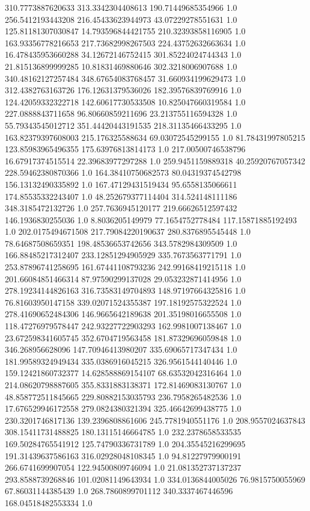 310.7773887620633	313.3342304408613	190.71449685354966	1.0
256.5412193443208	216.45433623944973	43.07229278551631	1.0
125.81181307030847	14.793596844421755	210.32393858116905	1.0
163.93356778216653	217.73682998267503	224.43752632663634	1.0
16.478435953660288	34.12672146752415	301.85224024744343	1.0
21.815136899999285	10.81831469880646	302.3218006907688	1.0
340.48162127257484	348.67654083768457	31.660934199629473	1.0
312.4382763163726	176.12631379536026	182.39576839769916	1.0
124.42059332322718	142.60617730533508	10.825047660319584	1.0
227.0888843711658	96.80660859211696	23.213755116594328	1.0
55.79343545012712	351.44420443191535	218.31135466433295	1.0
163.82379397608003	215.176325588634	69.03072545299155	1.0
81.78431997805215	123.85983965496355	175.63976813814173	1.0
217.00500746538796	16.67917374515514	22.39683977297288	1.0
259.9451159889318	40.25920767057342	228.59462380870366	1.0
164.38410750682573	80.04319374542798	156.13132490335892	1.0
167.47129431519434	95.6558135066611	174.85535332243407	1.0
48.252679377114404	314.524148111186	348.3185472132726	1.0
257.7636945120177	219.66626512597432	146.1936830255036	1.0
8.8036205149979	77.1654752778484	117.15871885192493	1.0
202.0175494671508	217.79084220190637	280.8376895545448	1.0
78.64687508659351	198.48536653742656	343.5782984309509	1.0
166.88485217312407	233.12851294905929	335.7673563771791	1.0
253.87896741258695	161.67441108793236	242.99168419215118	1.0
201.66084851466314	87.97590299137028	29.053232871414956	1.0
278.19234144826163	316.73583149704893	148.97197664325816	1.0
76.81603950147158	339.02071524355387	197.18192575322524	1.0
278.41690652484306	146.9665642189638	201.35198016655508	1.0
118.47276979578447	242.93227722903293	162.9981007138467	1.0
23.672598341605745	352.6704719563458	181.87329696059848	1.0
346.268956628096	147.70946413980207	335.69065717347434	1.0
181.99589324949434	335.0386916045215	326.9561544140446	1.0
159.12421860732377	14.628588869154107	68.63532042316464	1.0
214.08620798887605	355.8331883138371	172.81469083130767	1.0
48.858772511845665	229.80882153035793	236.7958265482536	1.0
17.676529946172558	279.0824380321394	325.46642699438775	1.0
230.3201746817136	139.2396808861606	245.7781940551176	1.0
208.9557024637843	308.15411731488825	180.13115146664785	1.0
232.2378658533535	169.50284765541912	125.74790336731789	1.0
204.35545216299695	191.31439637586163	316.02928048108345	1.0
94.81227979900191	266.6741699907054	122.94500809746094	1.0
21.081352737137237	293.8588739268846	101.02081149643934	1.0
334.0136844005026	76.9815750055969	67.86031144385439	1.0
268.7860899701112	340.3337467446596	168.04518482553334	1.0
